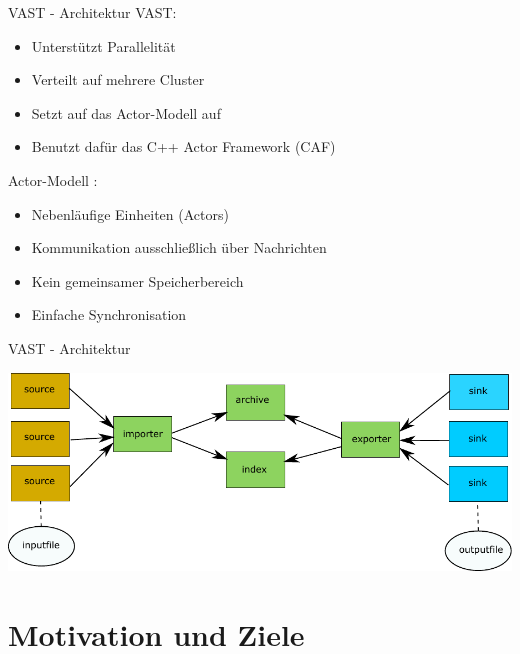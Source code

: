 \documentclass[9pt]{beamer}
\begin{document}
\begin{frame}{VAST - Architektur}{}
	VAST:
	\begin{itemize}
		\item Unterstützt Parallelität
		\item Verteilt auf mehrere Cluster
		\item Setzt auf das Actor-Modell auf
		\item Benutzt dafür das C++ Actor Framework (CAF)
	\end{itemize}	
	Actor-Modell :
	\begin{itemize}
		\item Nebenläufige Einheiten (Actors)
		\item Kommunikation ausschließlich über Nachrichten
		\item Kein gemeinsamer Speicherbereich
		\item Einfache Synchronisation
	\end{itemize}
\end{frame}
\begin{frame}{VAST - Architektur}{}
	\begin{center}
		\includegraphics[width=1.0\textwidth]{res/vast.pdf}
	\end{center}
\end{frame}


\section{Motivation und Ziele}
\end{document}
